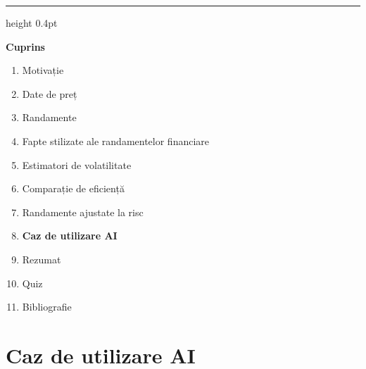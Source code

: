 \documentclass[9pt, aspectratio=169, t]{beamer}
\theoremstyle{definition}
\begin{document}
{
\begin{frame}{}
    {\color{FooterGray}\hrule height 0.4pt}
    \vspace{0.1cm}
    {\Large\textcolor{IDAred}{\textbf{Cuprins}}}
    \vspace{0.2cm}
    \begin{enumerate}
        \item Motivație \checkmark
        \item Date de preț \checkmark
        \item Randamente \checkmark
        \item Fapte stilizate ale randamentelor financiare \checkmark
        \item Estimatori de volatilitate \checkmark
        \item Comparație de eficiență \checkmark
        \item Randamente ajustate la risc \checkmark
        \item \textbf{Caz de utilizare AI}
        \item Rezumat
        \item Quiz
        \item Bibliografie
    \end{enumerate}
\end{frame}
}

\section{Caz de utilizare AI}
\end{document}
